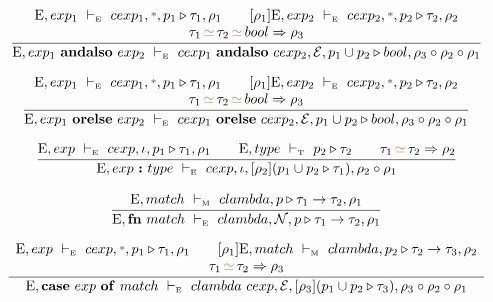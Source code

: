 \documentclass[11pt,a4paper]{article}
\newcommand{\key}[1]{\textrm{\textbf{#1}}}
\newcommand{\qualtype}[2]{#1 \triangleright #2}
\newcommand{\unify}[3]{#1\,{\color{brown}{\simeq}}\,#2 \Rightarrow #3}
\newcommand{\unifyThree}[4]{#1\,{\color{brown}{\simeq}}\,#2\,{\color{brown}{\simeq}}\,#3 \Rightarrow #4}
\newcommand{\wildcard}{{\color{gray}\scriptstyle\textbf{*}}}
\newcommand{\compose}[2]{#1 \circ #2}
\newcommand{\Env}  {\textrm{E}}
\newcommand{\vdashE}  {\ \vdash_{\textrm{\tiny E}}\  }
\newcommand{\vdashT}  {\ \vdash_{\textrm{\tiny T}}\  }
\newcommand{\vdashM}  {\ \vdash_{\textrm{\tiny M}}\  }
\newcommand{\xp} {\mathcal{E}}
\newcommand{\nxp}{\mathcal{N}}
\begin{document}
\[
\cfrac
 {\begin{array}{c}
  \Env, exp_1        \vdashE cexp_1,\wildcard,\qualtype{p_1}{\tau_1},\rho_1 \qquad
  [\rho_1]\Env,exp_2 \vdashE cexp_2,\wildcard,\qualtype{p_2}{\tau_2},\rho_2 \\
  \unifyThree{\tau_1}{\tau_2}{bool}{\rho_3}
  \end{array}}
 {\Env, exp_1\ \key{andalso}\ exp_2 \vdashE 
    cexp_1\ \key{andalso}\ cexp_2, \xp, 
    \qualtype{p_1 \cup p_2}{bool},
    \compose{\rho_3}{\compose{\rho_2}{\rho_1}}}
\]

\[
\cfrac
 {\begin{array}{c}
  \Env, exp_1        \vdashE cexp_1,\wildcard,\qualtype{p_1}{\tau_1},\rho_1 \qquad
  [\rho_1]\Env,exp_2 \vdashE cexp_2,\wildcard,\qualtype{p_2}{\tau_2},\rho_2 \\
  \unifyThree{\tau_1}{\tau_2}{bool}{\rho_3}
  \end{array} }
 {\Env, exp_1\ \key{orelse}\ exp_2 \vdashE
     cexp_1\ \key{orelse}\ cexp_2, \xp,
     \qualtype{p_1 \cup p_2}{bool},
     \compose{\rho_3}{\compose{\rho_2}{\rho_1}}}
\]

\[
\cfrac
 {\Env, exp \vdashE cexp, \iota, \qualtype{p_1}{\tau_1},\rho_1 \qquad
  \Env,type \vdashT \qualtype{p_2}{\tau_2}                     \qquad
  \unify{\tau_1}{\tau_2}{\rho_2}}
 {\Env, exp\ \key{:}\ type \vdashE
     cexp, \iota,
     [\rho_2](\qualtype{p_1 \cup p_2}{\tau_1}),
     \compose{\rho_2}{\rho_1}}
\]

\[
\cfrac
 {\Env,match \vdashM clambda,\qualtype{p}{\tau_1\to\tau_2},\rho_1}
 {\Env, \key{fn}\ match \vdashE clambda, \nxp, \qualtype{p}{\tau_1\to\tau_2}, \rho_1}
\]

\[
\cfrac
 {\begin{array}{c}
  \Env,exp \vdashE cexp, \wildcard, \qualtype{p_1}{\tau_1}, \rho_1    \qquad
  [\rho_1]\Env,match \vdashM clambda, \qualtype{p_2}{\tau_2\to\tau_3},\rho_2        \\
  \unify{\tau_1}{\tau_2}{\rho_3}
  \end{array}}
 {\Env,\key{case}\ exp\ \key{of}\ match \vdashE 
    clambda\ cexp, \xp,
    [\rho_3](\qualtype{p_1 \cup p_2}{\tau_3)},
    \compose{\rho_3}{\compose{\rho_2}{\rho_1}}}
\]
\end{document}
